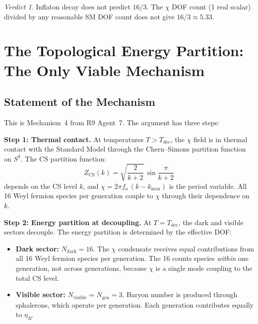\documentclass[11pt]{article}
\theoremstyle{definition}
\theoremstyle{remark}
\newtheorem*{verdict}{Verdict}
\begin{document}
\begin{verdict}
Inflaton decay does not predict $16/3$. The $\chi$ DOF count (1 real scalar)
divided by any reasonable SM DOF count does not give $16/3 \approx 5.33$.
\end{verdict}


\section{The Topological Energy Partition: The Only Viable Mechanism}
\label{sec:topological}

\subsection{Statement of the Mechanism}

This is Mechanism~4 from R9 Agent~7. The argument has three steps:

\textbf{Step 1: Thermal contact.}
At temperatures $T > T_\mathrm{dec}$, the $\chi$ field is in thermal contact
with the Standard Model through the Chern--Simons partition function on $S^3$.
The CS partition function:
\begin{equation}
  Z_\mathrm{CS}(k) = \sqrt{\frac{2}{k+2}}\,\sin\frac{\pi}{k+2}
\end{equation}
depends on the CS level $k$, and $\chi = 2\pi f_a\,(k - k_\mathrm{max})$
is the period variable. All 16 Weyl fermion species per generation couple
to $\chi$ through their dependence on $k$.

\textbf{Step 2: Energy partition at decoupling.}
At $T = T_\mathrm{dec}$, the dark and visible sectors decouple. The energy
partition is determined by the effective DOF:
\begin{itemize}
  \item \textbf{Dark sector:} $N_\mathrm{dark} = 16$. The $\chi$ condensate
    receives equal contributions from all 16 Weyl fermion species per
    generation. The 16 counts species \emph{within} one generation, not
    across generations, because $\chi$ is a single mode coupling to the
    total CS level.
  \item \textbf{Visible sector:} $N_\mathrm{visible} = N_\mathrm{gen} = 3$.
    Baryon number is produced through sphalerons, which operate per generation.
    Each generation contributes equally to $\eta_B$.
\end{itemize}
\end{document}
